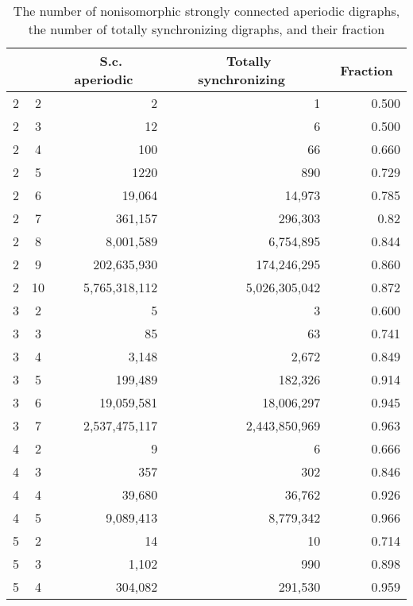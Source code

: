 \documentclass[runningheads]{llncs}
\begin{document}
\begin{table}
\caption{The number of nonisomorphic strongly connected aperiodic digraphs, the number of totally synchronizing digraphs, and their fraction}
\label{tab:exhaustive_results_2}
\begin{center}
\begin{tabular}{|c|c|r|r|r|}
  \hline                       
   &  &\multicolumn{1}{c|}{\ S.c. aperiodic\ }&\multicolumn{1}{c|}{\ Totally synchronizing\ }&\multicolumn{1}{c|}{\ Fraction\ }\\ \hline\hline
  2 & 2 & 2 & 1 & 0.500 \\ \hline  
  2 & 3 & 12 & 6 & 0.500 \\ \hline  
  2 & 4 & 100 & 66 & 0.660 \\ \hline  
  2 & 5 & 1220 & 890 & 0.729 \\ \hline  
  2 & 6 & 19,064 & 14,973 & 0.785\\ \hline  
  2 & 7 & 361,157 & 296,303 & 0.82\\ \hline  
  2 & 8 & 8,001,589 & 6,754,895 & 0.844\\ \hline  
  2 & 9 & 202,635,930 & 174,246,295 & 0.860\\ \hline  
  2 & 10 & 5,765,318,112 & 5,026,305,042 & 0.872\\ \hline  
  3 & 2 & 5 & 3 & 0.600 \\ \hline     
  3 & 3 & 85 & 63 & 0.741 \\ \hline  
  3 & 4 & 3,148 & 2,672 & 0.849 \\ \hline  
  3 & 5 & 199,489 & 182,326 & 0.914 \\ \hline  
  3 & 6 & 19,059,581 & 18,006,297 & 0.945 \\ \hline  
  3 & 7 & 2,537,475,117 & 2,443,850,969 & 0.963 \\ \hline    
  4 & 2 & 9 & 6 & 0.666 \\ \hline
  4 & 3 & 357 & 302 & 0.846 \\ \hline
  4 & 4 & 39,680 & 36,762 & 0.926 \\ \hline
  4 & 5 & 9,089,413 & 8,779,342 & 0.966 \\ \hline
  5 & 2 & 14 & 10 & 0.714 \\ \hline
  5 & 3 & 1,102 & 990 & 0.898 \\ \hline
  5 & 4 & 304,082 & 291,530 & 0.959 \\ \hline
\end{tabular}
\end{center}
\end{table}
\end{document}
